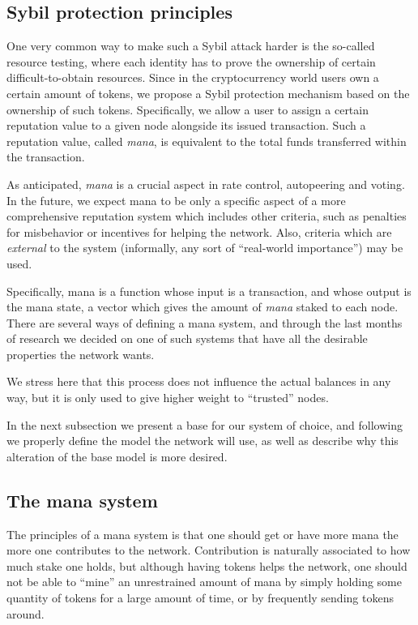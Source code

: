 \documentclass[../main.tex]{subfiles}
\begin{document}
\subsection{Sybil protection principles}\label{sec:sybil}

One very common way to make such a Sybil attack harder is the so-called resource testing, where each identity has to prove the ownership of certain difficult-to-obtain resources.
Since in the cryptocurrency world users own a certain amount of tokens, we propose a Sybil protection mechanism based on the ownership of such tokens. Specifically, we allow a user to assign a certain reputation value to a given node alongside its issued transaction. Such a reputation value, called \textit{mana}, is equivalent to the total funds transferred within the transaction.

As anticipated, \textit{mana} is a crucial aspect in rate control, autopeering and voting. In the future, we expect mana to be only a specific aspect of a more comprehensive reputation system which includes other criteria, such as penalties for misbehavior or incentives for helping the network.
Also, criteria which are \emph{external} to the system (informally, any sort of ``real-world importance'') may be used.

Specifically, mana is a function whose input is a transaction, and whose output is the mana state, a vector which gives the amount of \textit{mana} staked to each node. There are several ways of defining a mana system, and through the last months of research we decided on one of such systems that have all the desirable properties the network wants. 


We stress here that this process does not influence the actual balances in any way, but it is only used to give higher weight to \enquote{trusted} nodes.

In the next subsection we present a base for our system of choice, and  following we properly define the model the network will use, as well as describe why this alteration of the base model is more desired.


\subsection{The mana system}


The principles of a mana system is that one should get or have more mana the more one contributes
to the network. Contribution is naturally associated to how much stake one holds,
but although having tokens helps the network, one should not be able to ``mine'' 
an unrestrained amount of mana by simply holding some quantity
of tokens for a large amount of time, or by frequently sending tokens around.
\end{document}
